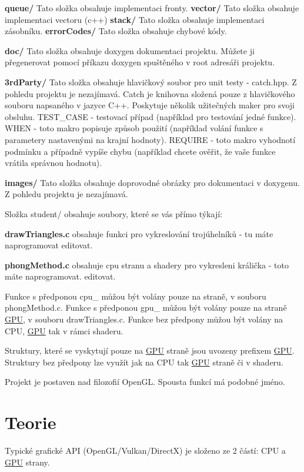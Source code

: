 {\bfseries queue/} Tato složka obsahuje implementaci fronty. {\bfseries vector/} Tato složka obsahuje implementaci vectoru (c++) {\bfseries stack/} Tato složka obsahuje implementaci zásobníku. {\bfseries error\+Codes/} Tato složka obsahuje chybové kódy.

{\bfseries doc/} Tato složka obsahuje doxygen dokumentaci projektu. Můžete ji přegenerovat pomocí příkazu doxygen spuštěného v root adresáři projektu.

{\bfseries 3rd\+Party/} Tato složka obsahuje hlavičkový soubor pro unit testy -\/ catch.\+hpp. Z pohledu projektu je nezajímavá. Catch je knihovna složená pouze z hlavičkového souboru napsaného v jazyce C++. Poskytuje několik užitečných maker pro svoji obsluhu. T\+E\+S\+T\+\_\+\+C\+A\+SE -\/ testovací případ (například pro testování jedné funkce). W\+H\+EN -\/ toto makro popisuje způsob použití (například volání funkce s parametery nastavenými na krajní hodnoty). R\+E\+Q\+U\+I\+RE -\/ toto makro vyhodnotí podmínku a případně vypíše chybu (například chcete ověřit, že vaše funkce vrátila správnou hodnotu).

{\bfseries images/} Tato složka obsahuje doprovodné obrázky pro dokumentaci v doxygenu. Z pohledu projektu je nezajímavá.

Složka student/ obsahuje soubory, které se vás přímo týkají\+:

{\bfseries draw\+Triangles.\+c} obsahuje funkci pro vykreslování trojúhelníků -\/ tu máte naprogramovat editovat.

{\bfseries phong\+Method.\+c} obsahuje cpu stranu a shadery pro vykresleni králička -\/ toto máte naprogramovat. editovat.

Funkce s předponou cpu\+\_\+ můžou být volány pouze na straně, v souboru phong\+Method.\+c. Funkce s předponou gpu\+\_\+ můžou být volány pouze na straně \hyperlink{structGPU}{G\+PU}, v souboru draw\+Triangles.\+c. Funkce bez předpony můžou být volány na C\+PU, \hyperlink{structGPU}{G\+PU} tak v rámci shaderu.

Struktury, které se vyskytují pouze na \hyperlink{structGPU}{G\+PU} straně jsou uvozeny prefixem \hyperlink{structGPU}{G\+PU}. Struktury bez předpony lze využít jak na C\+PU tak \hyperlink{structGPU}{G\+PU} straně či v shaderu.

Projekt je postaven nad filozofií Open\+GL. Spousta funkcí má podobné jméno.\hypertarget{index_teorie}{}\section{Teorie}\label{index_teorie}
Typické grafické A\+PI (Open\+G\+L/\+Vulkan/\+DirectX) je složeno ze 2 částí\+: C\+PU a \hyperlink{structGPU}{G\+PU} strany.

